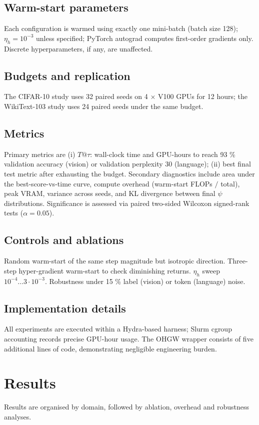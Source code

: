 \documentclass{article}
\begin{document}
\subsection{Warm-start parameters}
Each configuration is warmed using exactly one mini-batch (batch size 128); \(\eta_h = 10^{-3}\) unless specified; PyTorch autograd computes first-order gradients only. Discrete hyperparameters, if any, are unaffected.

\subsection{Budgets and replication}
The CIFAR-10 study uses 32 paired seeds on 4 \(\times\) V100 GPUs for 12 hours; the WikiText-103 study uses 24 paired seeds under the same budget.

\subsection{Metrics}
Primary metrics are (i) \(T@\tau\): wall-clock time and GPU-hours to reach 93 \% validation accuracy (vision) or validation perplexity 30 (language); (ii) best final test metric after exhausting the budget. Secondary diagnostics include area under the best-score-vs-time curve, compute overhead (warm-start FLOPs \(/\) total), peak VRAM, variance across seeds, and KL divergence between final \(\psi\) distributions. Significance is assessed via paired two-sided Wilcoxon signed-rank tests (\(\alpha = 0.05\)).

\subsection{Controls and ablations}
Random warm-start of the same step magnitude but isotropic direction. Three-step hyper-gradient warm-start to check diminishing returns. \(\eta_h\) sweep \(10^{-4} \dots 3\cdot 10^{-3}\). Robustness under 15 \% label (vision) or token (language) noise.

\subsection{Implementation details}
All experiments are executed within a Hydra-based harness; Slurm cgroup accounting records precise GPU-hour usage. The OHGW wrapper consists of five additional lines of code, demonstrating negligible engineering burden.

\section{Results}
Results are organised by domain, followed by ablation, overhead and robustness analyses.
\end{document}
